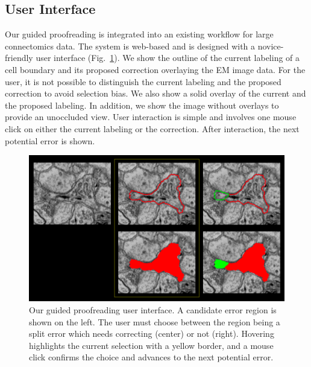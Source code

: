\subsection{User Interface}

Our guided proofreading is integrated into an existing workflow for large connectomics data. The system is web-based and is designed with a novice-friendly user interface (Fig.~\ref{fig:ui}). We show the outline of the current labeling of a cell boundary and its proposed correction overlaying the EM image data. For the user, it is not possible to distinguish the current labeling and the proposed correction to avoid selection bias. We also show a solid overlay of the current and the proposed labeling. In addition, we show the image without overlays to provide an unoccluded view. User interaction is simple and involves one mouse click on either the current labeling or the correction. After interaction, the next potential error is shown.

\begin{figure}[t]
\includegraphics[width=\linewidth]{gfx/user_interface_split.pdf}
\caption{Our guided proofreading user interface. A candidate error region is shown on the left. The user must choose between the region being a split error which needs correcting (center) or not (right). Hovering highlights the current selection with a yellow border, and a mouse click confirms the choice and advances to the next potential error.}
\label{fig:ui}
\end{figure}

